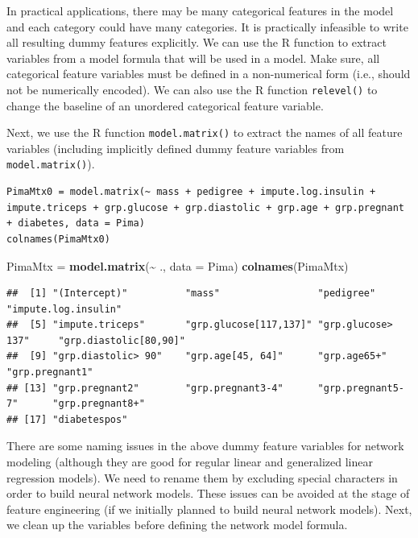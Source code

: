 \documentclass[
]{book}
\newenvironment{Shaded}{\begin{snugshade}}{\end{snugshade}}
\newcommand{\AttributeTok}[1]{\textcolor[rgb]{0.13,0.29,0.53}{#1}}
\newcommand{\FunctionTok}[1]{\textcolor[rgb]{0.13,0.29,0.53}{\textbf{#1}}}
\newcommand{\NormalTok}[1]{#1}
\newcommand{\OtherTok}[1]{\textcolor[rgb]{0.56,0.35,0.01}{#1}}
\newcommand{\SpecialCharTok}[1]{\textcolor[rgb]{0.81,0.36,0.00}{\textbf{#1}}}
\begin{document}
In practical applications, there may be many categorical features in the model and each category could have many categories. It is practically infeasible to write all resulting dummy features explicitly. We can use the R function to extract variables from a model formula that will be used in a model. Make sure, all categorical feature variables must be defined in a non-numerical form (i.e., should not be numerically encoded). We can also use the R function \texttt{relevel()} to change the baseline of an unordered categorical feature variable.

Next, we use the R function \texttt{model.matrix()} to extract the names of all feature variables (including implicitly defined dummy feature variables from \texttt{model.matrix()}).

\begin{verbatim}
PimaMtx0 = model.matrix(~ mass + pedigree + impute.log.insulin + impute.triceps + grp.glucose + grp.diastolic + grp.age + grp.pregnant + diabetes, data = Pima)
colnames(PimaMtx0)
\end{verbatim}

\begin{Shaded}
\begin{Highlighting}[]
\NormalTok{PimaMtx }\OtherTok{=} \FunctionTok{model.matrix}\NormalTok{(}\SpecialCharTok{\textasciitilde{}}\NormalTok{ ., }\AttributeTok{data =}\NormalTok{ Pima)}
\FunctionTok{colnames}\NormalTok{(PimaMtx)}
\end{Highlighting}
\end{Shaded}

\begin{verbatim}
##  [1] "(Intercept)"          "mass"                 "pedigree"             "impute.log.insulin"  
##  [5] "impute.triceps"       "grp.glucose[117,137]" "grp.glucose> 137"     "grp.diastolic[80,90]"
##  [9] "grp.diastolic> 90"    "grp.age[45, 64]"      "grp.age65+"           "grp.pregnant1"       
## [13] "grp.pregnant2"        "grp.pregnant3-4"      "grp.pregnant5-7"      "grp.pregnant8+"      
## [17] "diabetespos"
\end{verbatim}

There are some naming issues in the above dummy feature variables for network modeling (although they are good for regular linear and generalized linear regression models). We need to rename them by excluding special characters in order to build neural network models. These issues can be avoided at the stage of feature engineering (if we initially planned to build neural network models). Next, we clean up the variables before defining the network model formula.
\end{document}
